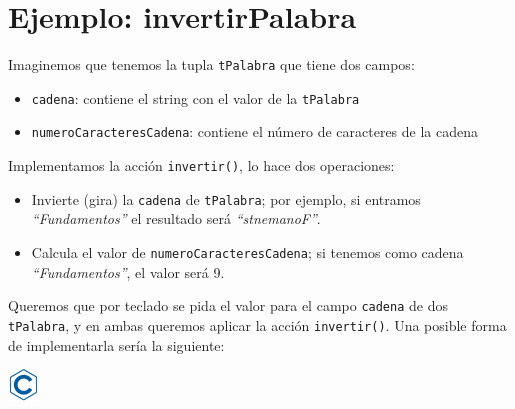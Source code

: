 \documentclass[
]{book}
\providecommand{\tightlist}{%
  \setlength{\itemsep}{0pt}\setlength{\parskip}{0pt}}
\begin{document}
\hypertarget{ejemplo-invertirpalabra}{%
\section{Ejemplo: invertirPalabra}\label{ejemplo-invertirpalabra}}

Imaginemos que tenemos la tupla \texttt{tPalabra} que tiene dos campos:

\begin{itemize}
\tightlist
\item
  \texttt{cadena}: contiene el string con el valor de la \texttt{tPalabra}
\item
  \texttt{numeroCaracteresCadena}: contiene el número de caracteres de la cadena
\end{itemize}

Implementamos la acción \texttt{invertir()}, lo hace dos operaciones:

\begin{itemize}
\tightlist
\item
  Invierte (gira) la \texttt{cadena} de \texttt{tPalabra}; por ejemplo, si entramos \emph{``Fundamentos''} el resultado será \emph{``stnemanoF''}.
\item
  Calcula el valor de \texttt{numeroCaracteresCadena}; si tenemos como cadena \emph{``Fundamentos''}, el valor será 9.
\end{itemize}

Queremos que por teclado se pida el valor para el campo \texttt{cadena} de dos \texttt{tPalabra}, y en ambas queremos aplicar la acción \texttt{invertir()}. Una posible forma de implementarla sería la siguiente:

\includegraphics{./img/c.png}
\end{document}
